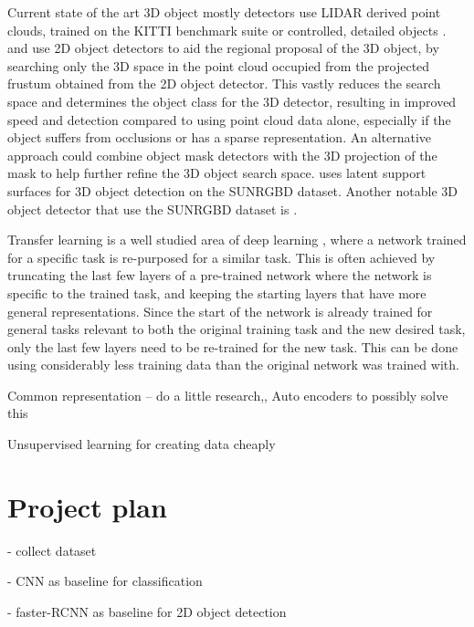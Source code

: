 \documentclass[11pt]{article}
\begin{document}
Current state of the art 3D object mostly detectors use LIDAR derived point clouds, trained on the KITTI benchmark suite \cite{point_fusion}\cite{multi_fusion}\cite{fast_furious}\cite{VoxelNet} or controlled, detailed objects \cite{subgroup_voting}\cite{pose_RGBD}\cite{real_time_single}. \cite{PointNets} and \cite{frustum} use 2D object detectors to aid the regional proposal of the 3D object, by searching only the 3D space in the point cloud occupied from the projected frustum obtained from the 2D object detector. This vastly reduces the search space and determines the object class for the 3D detector, resulting in improved speed and detection compared to using point cloud data alone, especially if the object suffers from occlusions or has a sparse representation. An alternative approach could combine object mask detectors\cite{first_person_mask}\cite{mask_RCNN} with the 3D projection of the mask to help further refine the 3D object search space. \cite{latent_surface} uses latent support surfaces for 3D object detection on the SUNRGBD dataset. Another notable 3D object detector that use the SUNRGBD dataset is \cite{SnapNet}. 

Transfer learning is a well studied area of deep learning \cite{DeCAF}\cite{survery_on_transfer}\cite{how_transferable}, where a network trained for a specific task is re-purposed for a similar task. This is often achieved by truncating the last few layers of a pre-trained network where the network is specific to the trained task, and keeping the starting layers that have more general representations. Since the start of the network is already trained for general tasks relevant to both the original training task and the new desired task, only the last few layers need to be re-trained for the new task. This can be done using considerably less training data than the original network was trained with.

Common representation -- do a little research,,
	Auto encoders to possibly solve this 

Unsupervised learning for creating data cheaply


\section{Project plan}

- collect dataset

- CNN as baseline for classification

- faster-RCNN as baseline for 2D object detection
\end{document}
